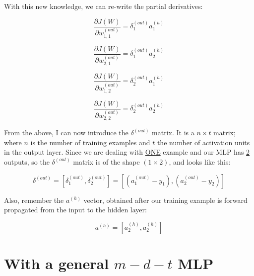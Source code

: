 \documentclass[12pt, letterpaper]{article}
\begin{document}
\vspace{5mm} %

With this new knowledge, we can re-write the partial derivatives:

\[
    \frac{\partial J(W)}{\partial w_{1,1}^{(out)}} =
    \delta_1^{(out)} a_1^{(h)}
\]

\[
    \frac{\partial J(W)}{\partial w_{2,1}^{(out)}} =
    \delta_1^{(out)} a_2^{(h)}
\]

\[
    \frac{\partial J(W)}{\partial w_{1,2}^{(out)}} =
    \delta_2^{(out)} a_1^{(h)}
\]

\[
    \frac{\partial J(W)}{\partial w_{2,2}^{(out)}} =
    \delta_2^{(out)} a_2^{(h)}
\]

From the above, I can now introduce the $\delta^{(out)}$ matrix.
It is a $n \times t$ matrix; where $n$ is the number of training
examples and $t$ the number of activation units in the output layer.
Since we are dealing with \underline{ONE} example and our MLP 
has \underline{2} outputs, so the $\delta^{(out)}$ matrix is of the 
shape $(1 \times 2)$, and looks like this:

\[
    \delta^{(out)} = [\delta_1^{(out)}, \delta_2^{(out)}] =
    [(a_{1}^{(out)} - y_1), (a_{2}^{(out)} - y_2)]
\]

\vspace{5mm} %

Also, remember the $a^{(h)}$ vector, obtained after our training
example is forward propagated from the input to the hidden layer:

\[
    a^{(h)} = [a_2^{(h)}, a_2^{(h)}]
\]



\section{With a general $m-d-t$ MLP}
\end{document}
